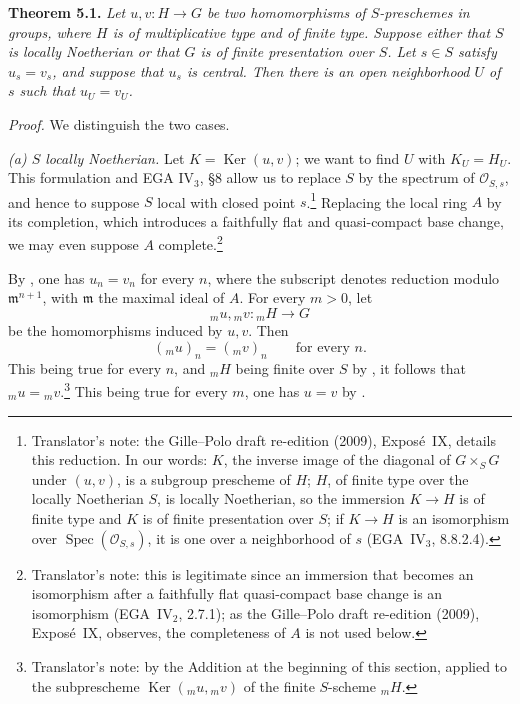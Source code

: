 \medskip
\noindent{}\textbf{Theorem 5.1.}
\textit{Let \(u,v:H\to G\) be two homomorphisms of \(S\)-preschemes in
groups, where \(H\) is of multiplicative type and of finite type.
Suppose either that \(S\) is locally Noetherian or that \(G\) is of
finite presentation over \(S\). Let \(s\in S\) satisfy \(u_s=v_s\), and
suppose that \(u_s\) is central. Then there is an open neighborhood
\(U\) of \(s\) such that \(u_U=v_U\).}

\emph{Proof.}
We distinguish the two cases.

\smallskip
{}\noindent\textit{(a) \(S\) locally Noetherian.}
Let \(K=\operatorname{Ker}(u,v)\); we want to find \(U\) with
\(K_U=H_U\). This formulation and EGA IV\(_3\), \S8 allow us to replace
\(S\) by the spectrum of \(\mathscr O_{S,s}\), and hence to suppose \(S\)
local with closed point \(s\).\footnote{Translator's note: the
Gille--Polo draft re-edition (2009), Expos\'e~IX, details this reduction.
In our words: \(K\), the inverse image of the diagonal of \(G\times_SG\)
under \((u,v)\), is a subgroup prescheme of \(H\); \(H\), of finite type
over the locally Noetherian \(S\), is locally Noetherian, so the immersion
\(K\to H\) is of finite type and \(K\) is of finite presentation over
\(S\); if \(K\to H\) is an isomorphism over
\(\operatorname{Spec}(\mathscr O_{S,s})\), it is one over a neighborhood
of \(s\) (EGA~IV\(_3\), 8.8.2.4).} Replacing the local ring \(A\) by its
completion, which introduces a faithfully flat and quasi-compact base
change, we may even suppose \(A\) complete.\footnote{Translator's note:
this is legitimate since an immersion that becomes an isomorphism after a
faithfully flat quasi-compact base change is an isomorphism
(EGA~IV\(_2\), 2.7.1); as the Gille--Polo draft re-edition (2009),
Expos\'e~IX, observes, the completeness of \(A\) is not used below.}

By , one has \(u_n=v_n\) for every
\(n\), where the subscript denotes reduction modulo
\(\mathfrak m^{n+1}\), with \(\mathfrak m\) the maximal ideal of \(A\).
For every \(m>0\), let
\[
  {}_mu,{}_mv:{}_mH\longrightarrow G
\]
be the homomorphisms induced by \(u,v\). Then
\[
  ({}_mu)_n=({}_mv)_n
  \qquad\text{for every }n.
\]
This being true for every \(n\), and \({}_mH\) being finite over \(S\)
by , it follows that
\({}_mu={}_mv\).\footnote{Translator's note: by the Addition at the
beginning of this section, applied to the subprescheme
\(\operatorname{Ker}({}_mu,{}_mv)\) of the finite \(S\)-scheme
\({}_mH\).} This being true for every \(m\), one has \(u=v\) by
.

